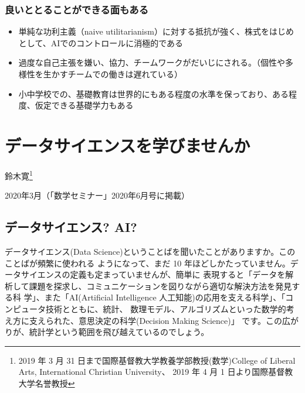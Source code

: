 \documentclass[
]{bxjsbook}
\providecommand{\tightlist}{%
  \setlength{\itemsep}{0pt}\setlength{\parskip}{0pt}}
\theoremstyle{definition}
\theoremstyle{definition}
\theoremstyle{definition}
\theoremstyle{definition}
\theoremstyle{remark}
\begin{document}
\hypertarget{ux826fux3044ux3068ux3068ux308bux3053ux3068ux304cux3067ux304dux308bux9762ux3082ux3042ux308b}{%
\subsubsection{良いととることができる面もある}\label{ux826fux3044ux3068ux3068ux308bux3053ux3068ux304cux3067ux304dux308bux9762ux3082ux3042ux308b}}

\begin{itemize}
\tightlist
\item
  単純な功利主義（naive utilitarianism）に対する抵抗が強く、株式をはじめとして、AIでのコントロールに消極的である
\item
  過度な自己主張を嫌い、協力、チームワークがだいじにされる。（個性や多様性を生かすチームでの働きは遅れている）
\item
  小中学校での、基礎教育は世界的にもある程度の水準を保っており、ある程度、仮定できる基礎学力もある
\end{itemize}

\hypertarget{susemi202006}{%
\section{データサイエンスを学びませんか}\label{susemi202006}}

鈴木寛\footnote{2019 年 3 月 31 日まで国際基督教大学教養学部教授(数学)College of Liberal Arts, International Christian University、 2019 年 4 月 1 日より国際基督教大学名誉教授}

2020年3月（「数学セミナー」2020年6月号に掲載）

\hypertarget{ux30c7ux30fcux30bfux30b5ux30a4ux30a8ux30f3ux30b9-ai}{%
\subsection{データサイエンス? AI?}\label{ux30c7ux30fcux30bfux30b5ux30a4ux30a8ux30f3ux30b9-ai}}

データサイエンス(Data Science)ということばを聞いたことがありますか。このことばが頻繁に使われる ようになって、まだ 10 年ほどしかたっていません。データサイエンスの定義も定まっていませんが、簡単に 表現すると「データを解析して課題を探求し、コミュニケーションを図りながら適切な解決方法を発見する科 学」、また「AI(Artificial Intelligence 人工知能)の応用を支える科学」、「コンピュータ技術とともに、統計、 数理モデル、アルゴリズムといった数学的考え方に支えられた、意思決定の科学(Decision Making Science)」 です。この広がりが、統計学という範囲を飛び越えているのでしょう。
\end{document}
